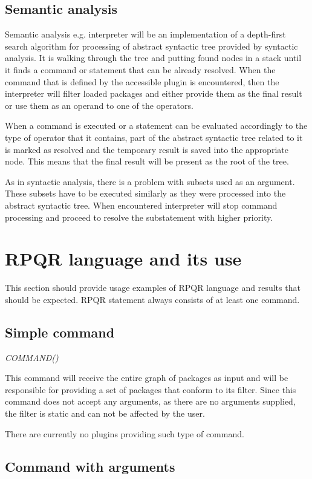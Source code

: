 \subsection*{Semantic analysis}
Semantic analysis e.g. interpreter will be an implementation of a depth-first search algorithm for processing
of abstract syntactic tree provided by syntactic analysis. It is walking through the tree and putting
found nodes in a stack until it finds a command or statement that can be already resolved. When the command
that is defined by the accessible plugin is encountered, then the interpreter will filter loaded packages and
either provide them as the final result or use them as an operand to one of the operators.

When a command is executed or a statement can be evaluated accordingly to the type of operator that it
contains, part of the abstract syntactic tree related to it is marked as resolved and the temporary result
is saved into the appropriate node. This means that the final result will be present as the root
of the tree.

As in syntactic analysis, there is a problem with subsets used as an argument. These subsets have
to be executed similarly as they were processed into the abstract syntactic tree. When encountered
interpreter will stop command processing and proceed to resolve the substatement with higher priority.

\section{RPQR language and its use}
This section should provide usage examples of RPQR language and results that should be expected.
RPQR statement always consists of at least one command.

\subsection*{Simple command}

\textit{COMMAND()}

This command will receive the entire graph of packages as input and will be responsible for providing
a set of packages that conform to its filter. Since this command does not accept any arguments, as there
are no arguments supplied, the filter is static and can not be affected by the user.

There are currently no plugins providing such type of command.

\subsection*{Command with arguments}

